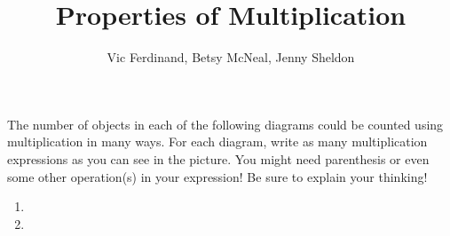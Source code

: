 \documentclass[nooutcomes]{ximera}
\title{Properties of Multiplication}
\author{Vic Ferdinand, Betsy McNeal, Jenny Sheldon}
\begin{document}
\begin{abstract} \end{abstract}
\maketitle



\begin{problem}

 The number of objects in each of the following diagrams could be counted using multiplication in many ways.  For each diagram, write as many multiplication expressions as you can see in the picture.  You might need parenthesis or even some other operation(s) in your expression!  Be sure to explain your thinking!
\begin{enumerate}
    \setlength\itemsep{1cm}
    \item \leavevmode\vadjust{\vspace{-\baselineskip}}
    \item \leavevmode\vadjust{\vspace{-\baselineskip}}
\end{enumerate}
\end{problem}
\end{document}
